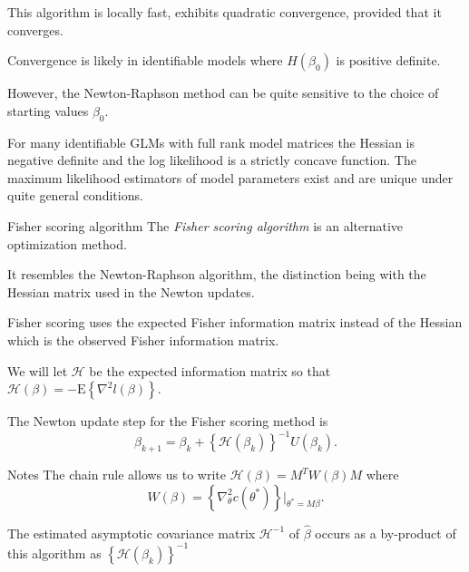 \documentclass[
  ignorenonframetext,
]{beamer}
\begin{document}
\begin{frame}{}
\protect\hypertarget{section-4}{}
This algorithm is locally fast, exhibits quadratic convergence, provided
that it converges.

\vspace{12pt}

Convergence is likely in identifiable models where \(H(\beta_{0})\) is
positive definite.

\vspace{12pt}

However, the Newton-Raphson method can be quite sensitive to the choice
of starting values \(\beta_{0}\).

\vspace{12pt}

For many identifiable GLMs with full rank model matrices the Hessian is
negative definite and the log likelihood is a strictly concave function.
The maximum likelihood estimators of model parameters exist and are
unique under quite general conditions.
\end{frame}

\begin{frame}{Fisher scoring algorithm}
\protect\hypertarget{fisher-scoring-algorithm}{}
The \emph{Fisher scoring algorithm} is an alternative optimization
method.

\vspace{12pt}

It resembles the Newton-Raphson algorithm, the distinction being with
the Hessian matrix used in the Newton updates.

\vspace{12pt}

Fisher scoring uses the expected Fisher information matrix instead of
the Hessian which is the observed Fisher information matrix.
\end{frame}

\begin{frame}{}
\protect\hypertarget{section-5}{}
We will let \(\mathcal{H}\) be the expected information matrix so that
\(\mathcal{H}(\beta) = -\text{E}\left\{\nabla^2 l(\beta)\right\}\).

\vspace{12pt}

The Newton update step for the Fisher scoring method is \[
  \beta_{k+1} = \beta_k + \left\{\mathcal{H}(\beta_k)\right\}^{-1} U(\beta_k).
\]
\end{frame}

\begin{frame}{Notes}
\protect\hypertarget{notes}{}
The chain rule allows us to write \(\mathcal{H}(\beta) = M^TW(\beta)M\)
where \[
  W(\beta) = \left\{\nabla_\theta^2 c(\theta^*)\right\}|_{\theta^* = M\beta}.
\]

The estimated asymptotic covariance matrix \(\mathcal{H}^{-1}\) of
\(\hat{\beta}\) occurs as a by-product of this algorithm as
\(\left\{\mathcal{H}(\beta_k)\right\}^{-1}\)
\end{frame}
\end{document}
